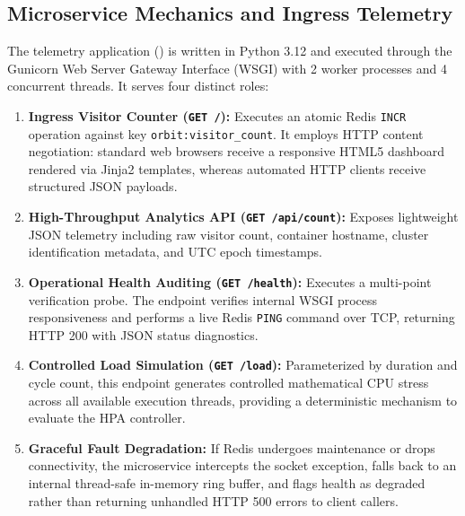 \documentclass[conference]{IEEEtran}
\begin{document}
\subsection{Microservice Mechanics and Ingress Telemetry}
The telemetry application () is written in Python 3.12 and executed through the Gunicorn Web Server Gateway Interface (WSGI) with 2 worker processes and 4 concurrent threads. It serves four distinct roles:
\begin{enumerate}
    \item \textbf{Ingress Visitor Counter (\texttt{GET /}):} Executes an atomic Redis \texttt{INCR} operation against key \texttt{orbit:visitor\_count}. It employs HTTP content negotiation: standard web browsers receive a responsive HTML5 dashboard rendered via Jinja2 templates, whereas automated HTTP clients receive structured JSON payloads.
    \item \textbf{High-Throughput Analytics API (\texttt{GET /api/count}):} Exposes lightweight JSON telemetry including raw visitor count, container hostname, cluster identification metadata, and UTC epoch timestamps.
    \item \textbf{Operational Health Auditing (\texttt{GET /health}):} Executes a multi-point verification probe. The endpoint verifies internal WSGI process responsiveness and performs a live Redis \texttt{PING} command over TCP, returning HTTP 200 with JSON status diagnostics.
    \item \textbf{Controlled Load Simulation (\texttt{GET /load}):} Parameterized by duration and cycle count, this endpoint generates controlled mathematical CPU stress across all available execution threads, providing a deterministic mechanism to evaluate the HPA controller.
    \item \textbf{Graceful Fault Degradation:} If Redis undergoes maintenance or drops connectivity, the microservice intercepts the socket exception, falls back to an internal thread-safe in-memory ring buffer, and flags health as degraded rather than returning unhandled HTTP 500 errors to client callers.
\end{enumerate}
\end{document}
